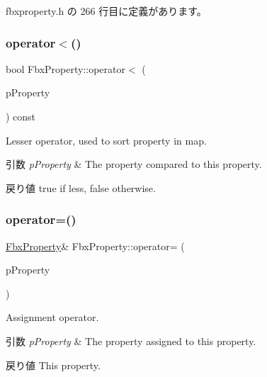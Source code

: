  fbxproperty.\+h の 266 行目に定義があります。

\mbox{\label{class_fbx_property_aa02dd8d143c2814367c1a81de6ab42a2}} 
\subsubsection{\texorpdfstring{operator$<$()}{operator<()}}
{\footnotesize\ttfamily bool Fbx\+Property\+::operator$<$ (\begin{DoxyParamCaption}\item[{const \hyperlink{class_fbx_property}{Fbx\+Property} \&}]{p\+Property }\end{DoxyParamCaption}) const}

Lesser operator, used to sort property in map. 
\begin{DoxyParams}{引数}
{\em p\+Property} & The property compared to this property. \\
\hline
\end{DoxyParams}
\begin{DoxyReturn}{戻り値}
{\ttfamily true} if less, {\ttfamily false} otherwise. 
\end{DoxyReturn}
\mbox{\label{class_fbx_property_a14126bd5d02fd8558c5946cc7ba12d46}} 
\subsubsection{\texorpdfstring{operator=()}{operator=()}}
{\footnotesize\ttfamily \hyperlink{class_fbx_property}{Fbx\+Property}\& Fbx\+Property\+::operator= (\begin{DoxyParamCaption}\item[{const \hyperlink{class_fbx_property}{Fbx\+Property} \&}]{p\+Property }\end{DoxyParamCaption})}

Assignment operator. 
\begin{DoxyParams}{引数}
{\em p\+Property} & The property assigned to this property. \\
\hline
\end{DoxyParams}
\begin{DoxyReturn}{戻り値}
This property. 
\end{DoxyReturn}
\mbox{\label{class_fbx_property_a5c68be7d9ec048949e5f0b489e1f687c}} 
